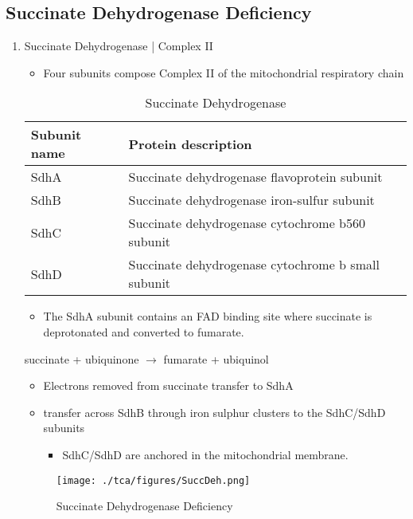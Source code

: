 \documentclass{scrartcl}
\begin{document}
\subsection{Succinate Dehydrogenase Deficiency}
\label{sec:org6902daf}
\begin{enumerate}
\item Succinate Dehydrogenase | Complex II
\label{sec:org01adbb2}
\begin{itemize}
\item Four subunits compose Complex II of the mitochondrial respiratory chain
\end{itemize}

\begin{table}[htbp]
\caption{\label{tab:org7ffdef4}
Succinate Dehydrogenase}
\centering
\begin{tabular}{ll}
Subunit name & Protein description\\
\hline
SdhA & Succinate dehydrogenase flavoprotein subunit\\
SdhB & Succinate dehydrogenase iron-sulfur subunit\\
SdhC & Succinate dehydrogenase cytochrome b560 subunit\\
SdhD & Succinate dehydrogenase cytochrome b small subunit\\
\end{tabular}
\end{table}

\begin{itemize}
\item The SdhA subunit contains an FAD binding site where succinate
is deprotonated and converted to fumarate.
\end{itemize}

succinate + ubiquinone \(\to\) fumarate + ubiquinol

\begin{itemize}
\item Electrons removed from succinate transfer to SdhA
\item transfer across SdhB through iron sulphur clusters to the SdhC/SdhD subunits
\begin{itemize}
\item SdhC/SdhD are anchored in the mitochondrial membrane.
\end{itemize}
\end{itemize}

\begin{figure}[htbp]
\centering
\texttt{[image: ./tca/figures/SuccDeh.png]}
\caption{\label{fig:org92a753b}
Succinate Dehydrogenase Deficiency}
\end{figure}


\end{enumerate}
\end{document}
